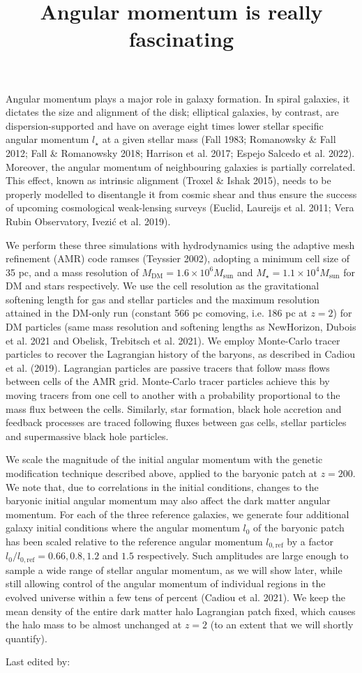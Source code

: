 \documentclass{article}
\title{Angular momentum is really fascinating}
\begin{document}
\maketitle

Angular momentum plays a major role in galaxy formation. In spiral
galaxies, it dictates the size and alignment of the disk; elliptical galaxies, by contrast, are dispersion-supported and have on average eight
times lower stellar specific angular momentum $l_\star$ at a given stellar mass (Fall 1983; Romanowsky \& Fall 2012; Fall \& Romanowsky
2018; Harrison et al. 2017; Espejo Salcedo et al. 2022). Moreover, the
angular momentum of neighbouring galaxies is partially correlated.
This effect, known as intrinsic alignment (Troxel \& Ishak 2015),
needs to be properly modelled to disentangle it from cosmic shear
and thus ensure the success of upcoming cosmological weak-lensing
surveys (Euclid, Laureijs et al. 2011; Vera Rubin Observatory, Ivezić
et al. 2019).

We perform these three simulations with hydrodynamics using
the adaptive mesh refinement (AMR) code ramses (Teyssier 2002),
adopting a minimum cell size of 35 pc, and a mass resolution of $M_\mathrm{DM} = 1.6 \times 10^6 M_\mathrm{sun}$ and $M_\star = 1.1 \times 10^4 M_\mathrm{sun}$ for DM and stars
respectively. We use the cell resolution as the gravitational softening
length for gas and stellar particles and the maximum resolution attained in the DM-only run (constant 566 pc comoving, i.e. 186 pc at
$z=2$) for DM particles (same mass resolution and softening lengths
as NewHorizon, Dubois et al. 2021 and Obelisk, Trebitsch et al.
2021). We employ Monte-Carlo tracer particles to recover the Lagrangian history of the baryons, as described in Cadiou et al. (2019).
Lagrangian particles are passive tracers that follow mass flows between cells of the AMR grid. Monte-Carlo tracer particles achieve this by moving tracers from one cell to another with a probability proportional to the mass flux between the cells. Similarly, star formation, black hole accretion and feedback processes are traced following
fluxes between gas cells, stellar particles and supermassive black hole
particles.

We scale the magnitude of the initial angular momentum with
the genetic modification technique described above, applied to the
baryonic patch at $z = 200$. We note that, due to correlations in the
initial conditions, changes to the baryonic initial angular momentum
may also affect the dark matter angular momentum. For each of the
three reference galaxies, we generate four additional galaxy initial
conditions where the angular momentum $l_0$ of the baryonic patch
has been scaled relative to the reference angular momentum $l_{0,\mathrm{ref}}$ by a
factor $l_0/ l_{0,\mathrm{ref}} = 0.66, 0.8, 1.2$ and $1.5$ respectively. Such amplitudes
are large enough to sample a wide range of stellar angular momentum,
as we will show later, while still allowing control of the angular
momentum of individual regions in the evolved universe within a
few tens of percent (Cadiou et al. 2021). We keep the mean density
of the entire dark matter halo Lagrangian patch fixed, which causes
the halo mass to be almost unchanged at $z = 2$ (to an extent that we
will shortly quantify).

Last edited by:
\end{document}
